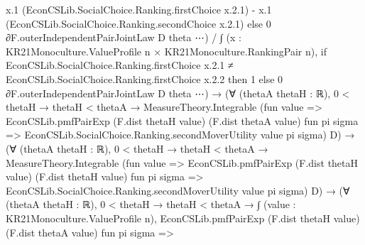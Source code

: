 \documentclass[10pt]{article}
\begin{document}
\begin{ReviewVerbatim}
                                                x.1 (EconCSLib.SocialChoice.Ranking.firstChoice x.2.1) -
                                                  x.1 (EconCSLib.SocialChoice.Ranking.secondChoice x.2.1)
                                              else 0 ∂F.outerIndependentPairJointLaw D theta ⋯) /
                                            ∫ (x : KR21Monoculture.ValueProfile n × KR21Monoculture.RankingPair n),
                                              if
                                                  EconCSLib.SocialChoice.Ranking.firstChoice x.2.1 ≠
                                                    EconCSLib.SocialChoice.Ranking.firstChoice x.2.2 then
                                                1
                                              else 0 ∂F.outerIndependentPairJointLaw D theta ⋯) →
                                    (∀ (thetaA thetaH : ℝ),
                                        0 < thetaH →
                                          thetaH < thetaA →
                                            MeasureTheory.Integrable
                                              (fun value =>
                                                EconCSLib.pmfPairExp (F.dist thetaH value) (F.dist thetaA value)
                                                  fun pi sigma =>
                                                  EconCSLib.SocialChoice.Ranking.secondMoverUtility value pi sigma)
                                              D) →
                                      (∀ (thetaA thetaH : ℝ),
                                          0 < thetaH →
                                            thetaH < thetaA →
                                              MeasureTheory.Integrable
                                                (fun value =>
                                                  EconCSLib.pmfPairExp (F.dist thetaH value) (F.dist thetaH value)
                                                    fun pi sigma =>
                                                    EconCSLib.SocialChoice.Ranking.secondMoverUtility value pi sigma)
                                                D) →
                                        (∀ (thetaA thetaH : ℝ),
                                            0 < thetaH →
                                              thetaH < thetaA →
                                                ∫ (value : KR21Monoculture.ValueProfile n),
                                                    EconCSLib.pmfPairExp (F.dist thetaH value) (F.dist thetaA value)
                                                      fun pi sigma =>

\end{ReviewVerbatim}
\end{document}
